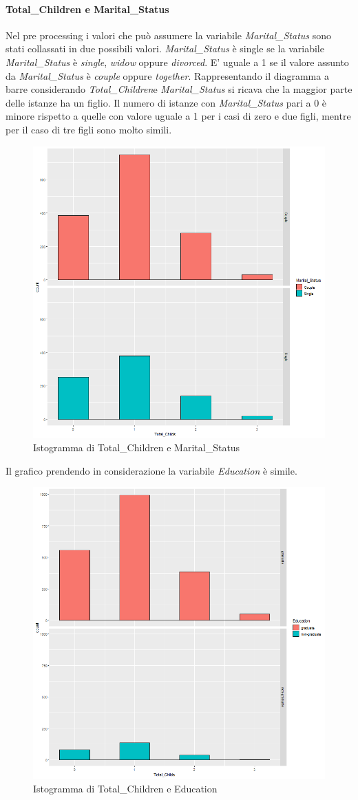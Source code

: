 \documentclass[letterpaper,11pt]{article}
\begin{document}
\paragraph{Total\_Children e Marital\_Status}
Nel pre processing i valori che può assumere la variabile \textit{Marital\_Status} sono stati collassati in due possibili valori.
\textit{Marital\_Status} è single se la variabile \textit{Marital\_Status}  è \textit{single}, \textit{widow} oppure \textit{divorced}.
E' uguale a 1 se il valore assunto da \textit{Marital\_Status} è \textit{couple} oppure \textit{together}.
Rappresentando il diagramma a barre considerando \textit{Total\_Children}e \textit{Marital\_Status} si ricava che la maggior parte delle istanze ha un figlio. Il numero di istanze con \textit{Marital\_Status} pari a 0 è minore rispetto a quelle con valore uguale a 1 per i casi di zero e due figli, mentre per il caso di tre figli sono molto simili.


\begin{figure}[H]
    \centering
    \includegraphics[width=.4\textwidth]{Img/EDA/EDA011.png}
    \caption{Istogramma di Total\_Children e Marital\_Status}
    \label{fig:IstogrammaTcMaritalStatus}
\end{figure}

Il grafico prendendo in considerazione la variabile \textit{Education} è simile. 

\begin{figure}[H]
    \centering
    \includegraphics[width=.4\textwidth]{Img/EDA/EDA012.png}
    \caption{Istogramma di Total\_Children e Education}
    \label{fig:IstogrammaTcEducation}
\end{figure}
\end{document}
